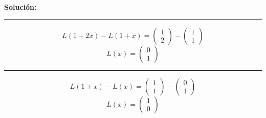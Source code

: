 \documentclass[12pt]{article}
\newenvironment{solucion}
{\begin{mdframed}[backgroundcolor=black!10]
		{\bf Solución:}\\
	}
	{
	\end{mdframed}
}
\newenvironment{preguntas}
{\begin{enumerate}\itemsep12pt
	}
	{
	\end{enumerate}
}
\begin{document}
\begin{preguntas}
\begin{solucion}
		\begin{center}\rule{14.5cm}{0.1pt}\end{center}
		$$L(1+2x) - L(1+x) = \begin{pmatrix}
		1\\2
		\end{pmatrix} - \begin{pmatrix}
		1\\1
		\end{pmatrix}$$
		$$L(x) = \begin{pmatrix}
		0\\1
		\end{pmatrix}$$
		
		\begin{center}\rule{14.5cm}{0.1pt}\end{center}
		$$L(1+x) - L(x) = \begin{pmatrix}
		1\\1
		\end{pmatrix} - \begin{pmatrix}
		0\\1
		\end{pmatrix}$$
		$$L(x) = \begin{pmatrix}
		1\\0
		\end{pmatrix}$$
		

\end{solucion}
\end{preguntas}
\end{document}
